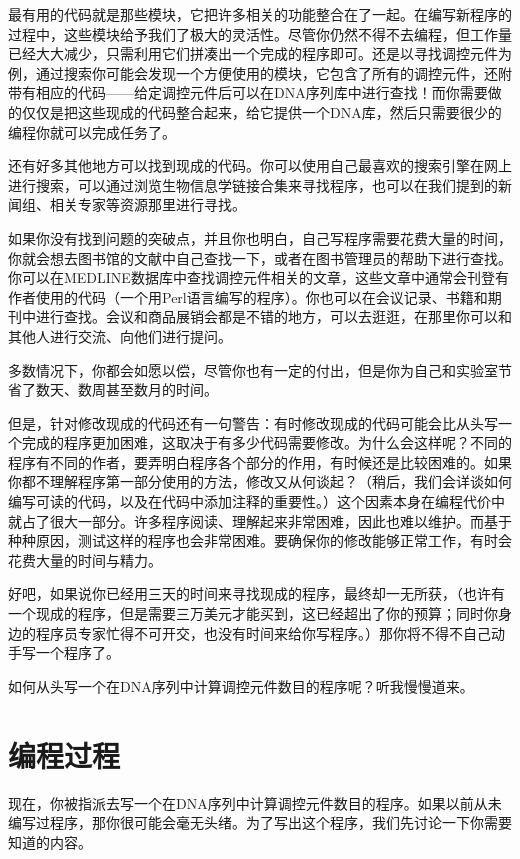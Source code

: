 最有用的代码就是那些模块，它把许多相关的功能整合在了一起。在编写新程序的过程中，这些模块给予我们了极大的灵活性。尽管你仍然不得不去编程，但工作量已经大大减少，只需利用它们拼凑出一个完成的程序即可。还是以寻找调控元件为例，通过搜索你可能会发现一个方便使用的模块，它包含了所有的调控元件，还附带有相应的代码——给定调控元件后可以在DNA序列库中进行查找！而你需要做的仅仅是把这些现成的代码整合起来，给它提供一个DNA库，然后只需要很少的编程你就可以完成任务了。

还有好多其他地方可以找到现成的代码。你可以使用自己最喜欢的搜索引擎在网上进行搜索，可以通过浏览生物信息学链接合集来寻找程序，也可以在我们提到的新闻组、相关专家等资源那里进行寻找。

如果你没有找到问题的突破点，并且你也明白，自己写程序需要花费大量的时间，你就会想去图书馆的文献中自己查找一下，或者在图书管理员的帮助下进行查找。你可以在MEDLINE数据库中查找调控元件相关的文章，这些文章中通常会刊登有作者使用的代码（一个用Perl语言编写的程序）。你也可以在会议记录、书籍和期刊中进行查找。会议和商品展销会都是不错的地方，可以去逛逛，在那里你可以和其他人进行交流、向他们进行提问。

多数情况下，你都会如愿以偿，尽管你也有一定的付出，但是你为自己和实验室节省了数天、数周甚至数月的时间。

但是，针对修改现成的代码还有一句警告：有时修改现成的代码可能会比从头写一个完成的程序更加困难，这取决于有多少代码需要修改。为什么会这样呢？不同的程序有不同的作者，要弄明白程序各个部分的作用，有时候还是比较困难的。如果你都不理解程序第一部分使用的方法，修改又从何谈起？（稍后，我们会详谈如何编写可读的代码，以及在代码中添加注释的重要性。）这个因素本身在编程代价中就占了很大一部分。许多程序阅读、理解起来非常困难，因此也难以维护。而基于种种原因，测试这样的程序也会非常困难。要确保你的修改能够正常工作，有时会花费大量的时间与精力。

好吧，如果说你已经用三天的时间来寻找现成的程序，最终却一无所获，（也许有一个现成的程序，但是需要三万美元才能买到，这已经超出了你的预算；同时你身边的程序员专家忙得不可开交，也没有时间来给你写程序。）那你将不得不自己动手写一个程序了。

如何从头写一个在DNA序列中计算调控元件数目的程序呢？听我慢慢道来。

\section{编程过程}
现在，你被指派去写一个在DNA序列中计算调控元件数目的程序。如果以前从未编写过程序，那你很可能会毫无头绪。为了写出这个程序，我们先讨论一下你需要知道的内容。

